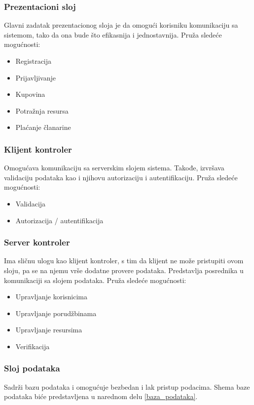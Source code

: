 \documentclass[a4paper, oneside]{article}
\begin{document}
\subsubsection{Prezentacioni sloj}
Glavni zadatak prezentacionog sloja je da omogući korisniku komunikaciju sa sistemom, tako da ona bude što efikasnija i jednostavnija. Pruža sledeće mogućnosti:
\begin{itemize}
    \item Registracija
    \item Prijavljivanje
    \item Kupovina
    \item Potražnja resursa
    \item Plaćanje članarine
\end{itemize}

\subsubsection{Klijent kontroler}
Omogućava komunikaciju sa serverskim slojem sistema. Takođe, izvršava validaciju podataka kao i njihovu autorizaciju i autentifikaciju. Pruža sledeće mogućnosti:
\begin{itemize}
    \item Validacija
    \item Autorizacija / autentifikacija
\end{itemize}

\subsubsection{Server kontroler}
Ima sličnu ulogu kao klijent kontroler, s tim da klijent ne može pristupiti ovom sloju, pa se na njemu vrše dodatne provere podataka. Predstavlja posrednika u komunikaciji sa slojem podataka. Pruža sledeće mogućnosti:
\begin{itemize}
    \item Upravljanje korisnicima
    \item Upravljanje porudžbinama
    \item Upravljanje resursima
    \item Verifikacija
\end{itemize}

\subsubsection{Sloj podataka}
Sadrži bazu podataka i omogućuje bezbedan i lak pristup podacima. Shema baze podataka biće predstavljena u narednom delu \ref{baza_podataka}.
\end{document}
